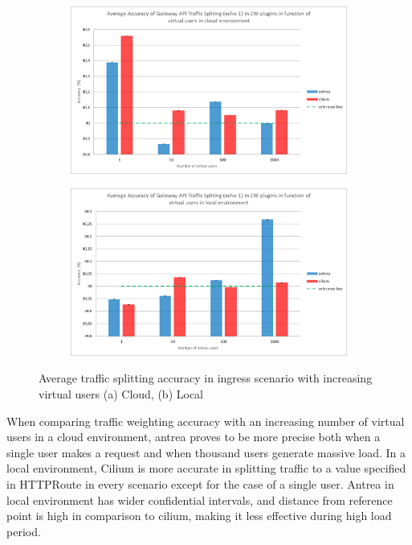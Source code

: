 \begin{figure}[H]
    \centering
    \begin{subfigure}[b]{0.8\textwidth}
        \includegraphics[width=\textwidth]{plots/traffic-splitting/vus_cloud_all.png}
        \caption{}
        \label{fig:vus_cloud_avg}
    \end{subfigure}
    \begin{subfigure}[b]{0.8\textwidth}
        \includegraphics[width=\textwidth]{plots/traffic-splitting/vus_local_all.png}
        \caption{}
        \label{fig:vus_local_avg}
    \end{subfigure}
    
    \caption{Average traffic splitting accuracy in ingress scenario with increasing virtual users (a) Cloud, (b) Local}
    \label{fig:vus_avg}
\end{figure}

When comparing traffic weighting accuracy with an increasing number of virtual users in a cloud environment, antrea proves to be more precise both when a single user makes a request and when thousand users generate massive load. In a local environment, Cilium is more accurate in splitting traffic to a value specified in HTTPRoute in every scenario except for the case of a single user. Antrea in local environment has wider confidential intervals, and distance from reference point is high in comparison to cilium, making it less effective during high load period.

